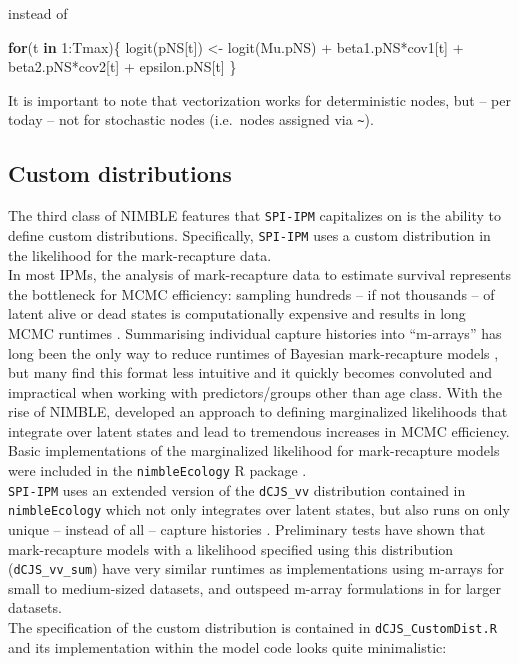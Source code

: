 \documentclass[
]{book}
\newenvironment{Shaded}{\begin{snugshade}}{\end{snugshade}}
\newcommand{\ControlFlowTok}[1]{\textcolor[rgb]{0.13,0.29,0.53}{\textbf{#1}}}
\newcommand{\DecValTok}[1]{\textcolor[rgb]{0.00,0.00,0.81}{#1}}
\newcommand{\FunctionTok}[1]{\textcolor[rgb]{0.00,0.00,0.00}{#1}}
\newcommand{\NormalTok}[1]{#1}
\newcommand{\OtherTok}[1]{\textcolor[rgb]{0.56,0.35,0.01}{#1}}
\newcommand{\SpecialCharTok}[1]{\textcolor[rgb]{0.00,0.00,0.00}{#1}}
\begin{document}
instead of

\begin{Shaded}
\begin{Highlighting}[]
\ControlFlowTok{for}\NormalTok{(t }\ControlFlowTok{in} \DecValTok{1}\SpecialCharTok{:}\NormalTok{Tmax)\{}
  \FunctionTok{logit}\NormalTok{(pNS[t]) }\OtherTok{\textless{}{-}} \FunctionTok{logit}\NormalTok{(Mu.pNS) }\SpecialCharTok{+}\NormalTok{ beta1.pNS}\SpecialCharTok{*}\NormalTok{cov1[t] }\SpecialCharTok{+}\NormalTok{ beta2.pNS}\SpecialCharTok{*}\NormalTok{cov2[t] }\SpecialCharTok{+}\NormalTok{ epsilon.pNS[t]}
\NormalTok{\}}
\end{Highlighting}
\end{Shaded}

It is important to note that vectorization works for deterministic nodes, but
-- per today -- not for stochastic nodes (i.e.~nodes assigned via \texttt{\textasciitilde{}}).

\hypertarget{custom-distributions}{%
\subsection{Custom distributions}\label{custom-distributions}}

The third class of NIMBLE features that \texttt{SPI-IPM} capitalizes on is the ability
to define custom distributions. Specifically, \texttt{SPI-IPM} uses a custom distribution
in the likelihood for the mark-recapture data.\\
In most IPMs, the analysis of mark-recapture data to estimate survival represents
the bottleneck for MCMC efficiency: sampling hundreds -- if not thousands -- of
latent alive or dead states is computationally expensive and results in long
MCMC runtimes \citep{gimenez2007}.
Summarising individual capture histories into ``m-arrays'' has long been the only
way to reduce runtimes of Bayesian mark-recapture models \citep{kery2011}, but many
find this format less intuitive and it quickly becomes convoluted and impractical
when working with predictors/groups other than age class. With the rise of
NIMBLE, \citet{turek2016} developed an approach to defining marginalized likelihoods
that integrate over latent states and lead to tremendous increases in MCMC
efficiency. Basic implementations of the marginalized likelihood for mark-recapture
models were included in the \texttt{nimbleEcology} R package \citep{nimbleEcol}.\\
\texttt{SPI-IPM} uses an extended version of the \texttt{dCJS\_vv} distribution contained in
\texttt{nimbleEcology} which not only integrates over latent states, but also runs on
only unique -- instead of all -- capture histories \citep[analogous to the goose
example in][]{turek2016}. Preliminary tests have shown that mark-recapture models
with a likelihood specified using this distribution (\texttt{dCJS\_vv\_sum}) have very
similar runtimes as implementations using m-arrays for small to medium-sized
datasets, and outspeed m-array formulations in for larger datasets.\\
The specification of the custom distribution is contained in \texttt{dCJS\_CustomDist.R}
and its implementation within the model code looks quite minimalistic:
\end{document}
